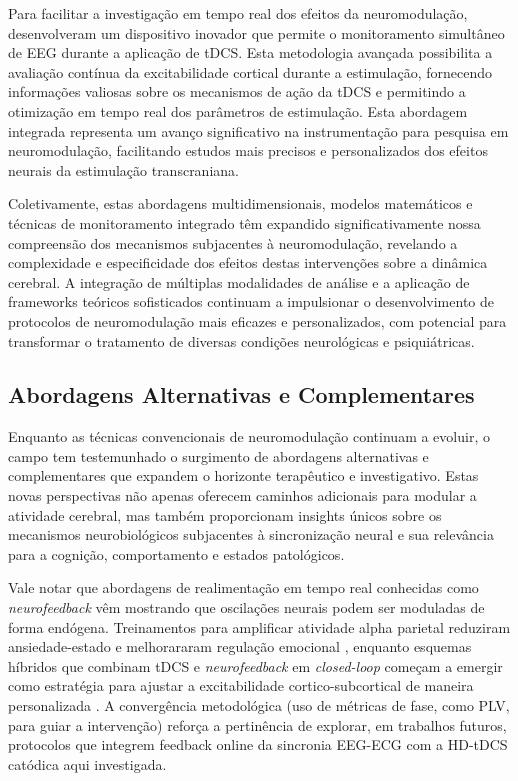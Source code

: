 Para facilitar a investigação em tempo real dos efeitos da neuromodulação,  desenvolveram um dispositivo inovador que permite o monitoramento simultâneo de EEG durante a aplicação de tDCS. Esta metodologia avançada possibilita a avaliação contínua da excitabilidade cortical durante a estimulação, fornecendo informações valiosas sobre os mecanismos de ação da tDCS e permitindo a otimização em tempo real dos parâmetros de estimulação. Esta abordagem integrada representa um avanço significativo na instrumentação para pesquisa em neuromodulação, facilitando estudos mais precisos e personalizados dos efeitos neurais da estimulação transcraniana.

Coletivamente, estas abordagens multidimensionais, modelos matemáticos e técnicas de monitoramento integrado têm expandido significativamente nossa compreensão dos mecanismos subjacentes à neuromodulação, revelando a complexidade e especificidade dos efeitos destas intervenções sobre a dinâmica cerebral. A integração de múltiplas modalidades de análise e a aplicação de frameworks teóricos sofisticados continuam a impulsionar o desenvolvimento de protocolos de neuromodulação mais eficazes e personalizados, com potencial para transformar o tratamento de diversas condições neurológicas e psiquiátricas.

\subsection{Abordagens Alternativas e Complementares}
Enquanto as técnicas convencionais de neuromodulação continuam a evoluir, o campo tem testemunhado o surgimento de abordagens alternativas e complementares que expandem o horizonte terapêutico e investigativo. Estas novas perspectivas não apenas oferecem caminhos adicionais para modular a atividade cerebral, mas também proporcionam insights únicos sobre os mecanismos neurobiológicos subjacentes à sincronização neural e sua relevância para a cognição, comportamento e estados patológicos.

Vale notar que abordagens de realimentação em tempo real conhecidas como \textit{neurofeedback} vêm mostrando que oscilações neurais podem ser moduladas de forma endógena. Treinamentos para amplificar atividade alpha parietal reduziram ansiedade-estado e melhorararam regulação emocional \cite{hou2021neurofeedback}, enquanto esquemas híbridos que combinam tDCS e \textit{neurofeedback} em \textit{closed-loop} começam a emergir como estratégia para ajustar a excitabilidade cortico-subcortical de maneira personalizada \cite{zilverstand2015fmri}. A convergência metodológica (uso de métricas de fase, como PLV, para guiar a intervenção) reforça a pertinência de explorar, em trabalhos futuros, protocolos que integrem feedback online da sincronia EEG-ECG com a HD-tDCS catódica aqui investigada.

